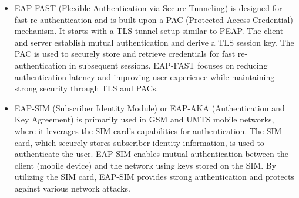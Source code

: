 \documentclass{article}
\begin{document}
\begin{itemize}
	\item[] EAP-FAST (Flexible Authentication via Secure Tunneling) is designed for fast re-authentication and is built upon a PAC (Protected Access Credential) mechanism. It starts with a TLS tunnel setup similar to PEAP. The client and server establish mutual authentication and derive a TLS session key. The PAC is used to securely store and retrieve credentials for fast re-authentication in subsequent sessions.  EAP-FAST focuses on reducing authentication latency and improving user experience while maintaining strong security through TLS and PACs.
	\item[] EAP-SIM (Subscriber Identity Module) or EAP-AKA (Authentication and Key Agreement) is primarily used in GSM and UMTS mobile networks, where it leverages the SIM card’s capabilities for authentication. The SIM card, which securely stores subscriber identity information, is used to authenticate the user. EAP-SIM enables mutual authentication between the client (mobile device) and the network using keys stored on the SIM. By utilizing the SIM card, EAP-SIM provides strong authentication and protects against various network attacks.
  

\end{itemize}
\end{document}
